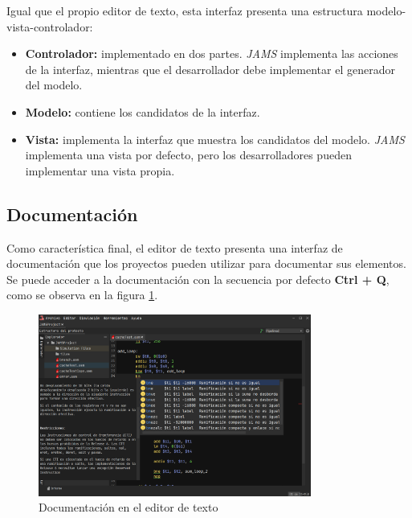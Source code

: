 Igual que el propio editor de texto, esta interfaz
presenta una estructura modelo-vista-controlador:

\begin{itemize}
    \item \textbf{Controlador:} implementado en dos partes.
    \textit{JAMS} implementa las acciones de la interfaz,
    mientras que el desarrollador debe implementar el
    generador del modelo.
    \item \textbf{Modelo:} contiene los candidatos de
    la interfaz.
    \item \textbf{Vista:} implementa la interfaz que
    muestra los candidatos del modelo.
    \textit{JAMS} implementa una vista por defecto,
    pero los desarrolladores pueden implementar una
    vista propia.
\end{itemize}

\subsection{Documentación}\label{subsec:documentacion}

Como característica final, el editor de texto presenta
una interfaz de documentación que los proyectos
pueden utilizar para documentar sus elementos.
Se puede acceder a la documentación con la secuencia por defecto
\textbf{Ctrl + Q}, como se observa en la figura \ref{fig:jams-documentacion}.

\begin{figure}[h]
    \centering
    \includegraphics[width=0.8\textwidth]{images/base/jams-documentation}
    \caption{Documentación en el editor de texto}
    \label{fig:jams-documentacion}
\end{figure}
